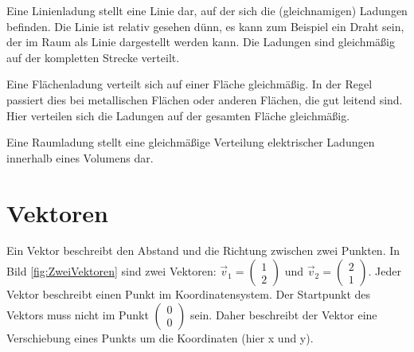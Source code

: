 \documentclass[aspectratio=169, ignorenonframetext]{beamer}
\begin{document}
Eine Linienladung stellt eine Linie dar, auf der sich die (gleichnamigen) Ladungen befinden. Die Linie ist relativ gesehen dünn, es kann zum Beispiel ein Draht sein, der im Raum als Linie dargestellt werden kann. Die Ladungen sind gleichmäßig auf der kompletten Strecke verteilt.

Eine Flächenladung verteilt sich auf einer Fläche gleichmäßig. In der Regel passiert dies bei metallischen Flächen oder anderen Flächen, die gut leitend sind. Hier verteilen sich die Ladungen auf der gesamten Fläche gleichmäßig.

Eine Raumladung stellt eine gleichmäßige Verteilung elektrischer Ladungen innerhalb eines Volumens dar.

\section{Vektoren}

Ein Vektor beschreibt den Abstand und die Richtung zwischen zwei Punkten. In Bild \ref{fig:ZweiVektoren} sind zwei Vektoren: $\vec{v}_1= \left(\begin{array}{c} 1 \\ 2 \end{array}\right)$ und  $\vec{v}_2= \left(\begin{array}{c} 2 \\ 1 \end{array}\right)$. Jeder Vektor beschreibt einen Punkt im Koordinatensystem. Der Startpunkt des Vektors muss nicht im Punkt $\left(\begin{array}{c}0\\0\end{array}\right)$ sein. Daher beschreibt der Vektor eine Verschiebung eines Punkts um die Koordinaten (hier x und y).
\end{document}
